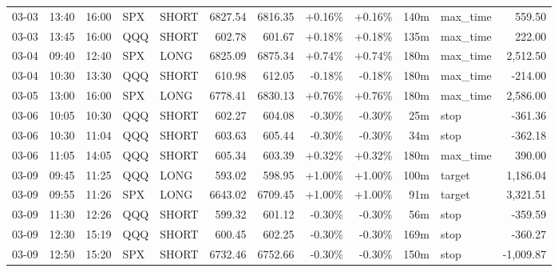 \documentclass[11pt,a4paper,twoside]{article}
\begin{document}
\begin{center}
\begin{longtable}{>{\color{txtmain}}l l l l l r r r r r >{\color{txtmain}}l r}
03-03 & 13:40 & 16:00 & SPX & SHORT & 6827.54 & 6816.35 & \textcolor{wingreen}{+0.16\%} & \textcolor{wingreen}{+0.16\%} & 140m & max\_time & \textcolor{wingreen}{559.50} \\
03-03 & 13:45 & 16:00 & QQQ & SHORT & 602.78 & 601.67 & \textcolor{wingreen}{+0.18\%} & \textcolor{wingreen}{+0.18\%} & 135m & max\_time & \textcolor{wingreen}{222.00} \\
03-04 & 09:40 & 12:40 & SPX & LONG & 6825.09 & 6875.34 & \textcolor{wingreen}{+0.74\%} & \textcolor{wingreen}{+0.74\%} & 180m & max\_time & \textcolor{wingreen}{2,512.50} \\
03-04 & 10:30 & 13:30 & QQQ & SHORT & 610.98 & 612.05 & \textcolor{lossred}{-0.18\%} & \textcolor{lossred}{-0.18\%} & 180m & max\_time & \textcolor{lossred}{-214.00} \\
03-05 & 13:00 & 16:00 & SPX & LONG & 6778.41 & 6830.13 & \textcolor{wingreen}{+0.76\%} & \textcolor{wingreen}{+0.76\%} & 180m & max\_time & \textcolor{wingreen}{2,586.00} \\
03-06 & 10:05 & 10:30 & QQQ & SHORT & 602.27 & 604.08 & \textcolor{lossred}{-0.30\%} & \textcolor{lossred}{-0.30\%} & 25m & stop & \textcolor{lossred}{-361.36} \\
03-06 & 10:30 & 11:04 & QQQ & SHORT & 603.63 & 605.44 & \textcolor{lossred}{-0.30\%} & \textcolor{lossred}{-0.30\%} & 34m & stop & \textcolor{lossred}{-362.18} \\
03-06 & 11:05 & 14:05 & QQQ & SHORT & 605.34 & 603.39 & \textcolor{wingreen}{+0.32\%} & \textcolor{wingreen}{+0.32\%} & 180m & max\_time & \textcolor{wingreen}{390.00} \\
03-09 & 09:45 & 11:25 & QQQ & LONG & 593.02 & 598.95 & \textcolor{wingreen}{+1.00\%} & \textcolor{wingreen}{+1.00\%} & 100m & target & \textcolor{wingreen}{1,186.04} \\
03-09 & 09:55 & 11:26 & SPX & LONG & 6643.02 & 6709.45 & \textcolor{wingreen}{+1.00\%} & \textcolor{wingreen}{+1.00\%} & 91m & target & \textcolor{wingreen}{3,321.51} \\
03-09 & 11:30 & 12:26 & QQQ & SHORT & 599.32 & 601.12 & \textcolor{lossred}{-0.30\%} & \textcolor{lossred}{-0.30\%} & 56m & stop & \textcolor{lossred}{-359.59} \\
03-09 & 12:30 & 15:19 & QQQ & SHORT & 600.45 & 602.25 & \textcolor{lossred}{-0.30\%} & \textcolor{lossred}{-0.30\%} & 169m & stop & \textcolor{lossred}{-360.27} \\
03-09 & 12:50 & 15:20 & SPX & SHORT & 6732.46 & 6752.66 & \textcolor{lossred}{-0.30\%} & \textcolor{lossred}{-0.30\%} & 150m & stop & \textcolor{lossred}{-1,009.87} \\

\end{longtable}
\end{center}
\end{document}
